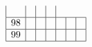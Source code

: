 \documentclass{article}
\begin{document}
{$$\begin{array}{|r|*{6}{r|}}
 & 
 & 
 & 
\\
\hline
98 
 & 
 & 
 & 
 & 
 & 
 & 
\\
\hline
99 
 & 
 & 
 & 
 & 
 & 
 & 
\\
\hline
\end{array}
$$
$$
\begin{array}{|r|*{6}{r|}}

\end{array}$$}
\end{document}
